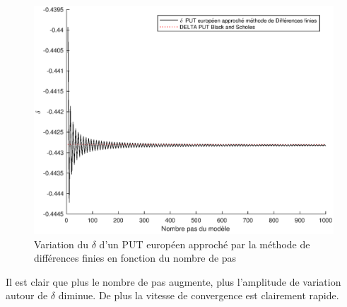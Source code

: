 \begin{figure}[H]
\centering
\includegraphics[scale=0.6]{./img/DELTA_PUT_EURO_DF-BS.eps}
\caption{Variation du $\delta$ d'un PUT européen approché par la méthode de différences finies en fonction du nombre de pas}
\label{fig:delta_put_euro_df}
\end{figure}

Il est clair que plus le nombre de pas augmente, plus l'amplitude de variation autour de $\delta$ diminue. De plus la vitesse de convergence est clairement rapide.